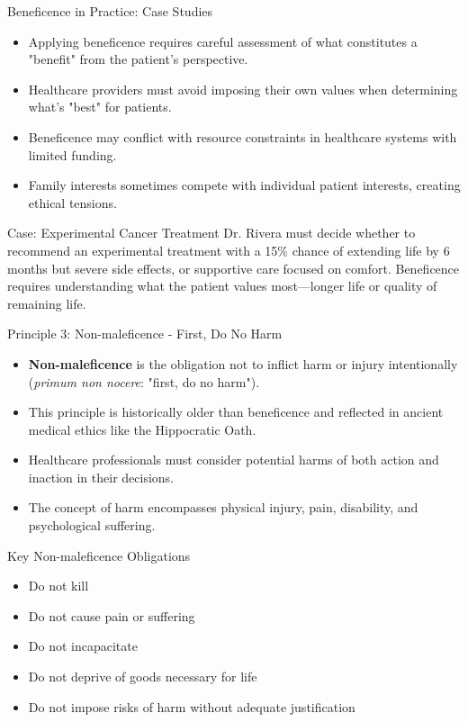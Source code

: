 \documentclass{beamer}
\begin{document}
	\begin{frame}{Beneficence in Practice: Case Studies}
		\begin{itemize}
			\item Applying beneficence requires careful assessment of what constitutes a "benefit" from the patient's perspective.
			\item Healthcare providers must avoid imposing their own values when determining what's "best" for patients.
			\item Beneficence may conflict with resource constraints in healthcare systems with limited funding.
			\item Family interests sometimes compete with individual patient interests, creating ethical tensions.
		\end{itemize}
		
		\begin{exampleblock}{Case: Experimental Cancer Treatment}
			Dr. Rivera must decide whether to recommend an experimental treatment with a 15\% chance of extending life by 6 months but severe side effects, or supportive care focused on comfort. Beneficence requires understanding what the patient values most—longer life or quality of remaining life.
		\end{exampleblock}
	\end{frame}
	
	\begin{frame}{Principle 3: Non-maleficence - First, Do No Harm}
		\begin{itemize}
			\item \textbf{Non-maleficence} is the obligation not to inflict harm or injury intentionally (\textit{primum non nocere}: "first, do no harm").
			\item This principle is historically older than beneficence and reflected in ancient medical ethics like the Hippocratic Oath.
			\item Healthcare professionals must consider potential harms of both action and inaction in their decisions.
			\item The concept of harm encompasses physical injury, pain, disability, and psychological suffering.
		\end{itemize}
		
		\begin{block}{Key Non-maleficence Obligations}
			\begin{itemize}
				\item Do not kill
				\item Do not cause pain or suffering
				\item Do not incapacitate
				\item Do not deprive of goods necessary for life
				\item Do not impose risks of harm without adequate justification
			\end{itemize}
		\end{block}
	\end{frame}
	
\end{document}
